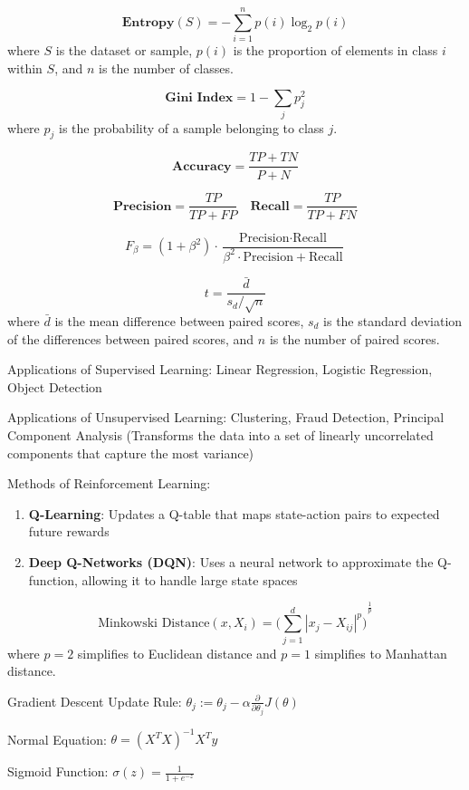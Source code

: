 \documentclass[twocolumn]{article}
\begin{document}
\[\textbf{Entropy}(S)=-\sum_{i=1}^n p(i)\log_2 p(i)\] where $S$ is the dataset or sample, $p(i)$ is the proportion of elements in class $i$ within $S$, and $n$ is the number of classes.

\[\textbf{Gini Index}=1-\sum_j p_j^2\] where $p_j$ is the probability of a sample belonging to class $j$.

\[\textbf{Accuracy}=\frac{TP+TN}{P+N}\]

\[\textbf{Precision}=\frac{TP}{TP+FP}\quad\textbf{Recall}=\frac{TP}{TP+FN}\]

\[F_\beta = (1+\beta^2)\cdot\frac{\text{Precision}\cdot\text{Recall}}{\beta^2\cdot\text{Precision}+\text{Recall}}\]

\[t=\frac{\bar{d}}{s_d / \sqrt{n}}\] where $\bar{d}$ is the mean difference between paired scores, $s_d$ is the standard deviation of the differences between paired scores, and $n$ is the number of paired scores.
\vspace{1em}

Applications of Supervised Learning: Linear Regression, Logistic Regression, Object Detection
\vspace{1em}

Applications of Unsupervised Learning: Clustering, Fraud Detection, Principal Component Analysis (Transforms the data into a set of linearly uncorrelated components that capture the most variance)
\vspace{1em}

Methods of Reinforcement Learning:
\begin{enumerate}
    \item \textbf{Q-Learning}: Updates a Q-table that maps state-action pairs to expected future rewards
    \item \textbf{Deep Q-Networks (DQN)}: Uses a neural network to approximate the Q-function, allowing it to handle large state spaces
\end{enumerate}

\[\text{Minkowski Distance}(x, X_i)={\Bigg(\sum_{j=1}^d {|x_j - X_{ij}|}^p\Bigg)}^\frac{1}{p}\] where $p=2$ simplifies to Euclidean distance and $p=1$ simplifies to Manhattan distance.
\vspace{1em}

Gradient Descent Update Rule: $\theta_j := \theta_j - \alpha\frac{\partial}{\partial\theta_j}J(\theta)$

Normal Equation: $\theta={(X^T X)}^{-1}X^T y$
\vspace{1em}

Sigmoid Function: $\sigma(z)=\frac{1}{1+e^{-z}}$
\end{document}
